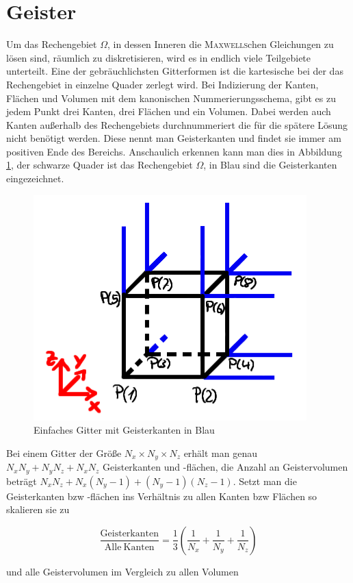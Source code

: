 
\section{Geister}

Um das Rechengebiet $\Omega$, in dessen Inneren die \textsc{Maxwells}chen Gleichungen zu lösen sind, räumlich zu diskretisieren, wird es in endlich viele Teilgebiete unterteilt. Eine der gebräuchlichsten Gitterformen ist die kartesische bei der das Rechengebiet in einzelne Quader zerlegt wird. Bei Indizierung der Kanten, Flächen und Volumen mit dem kanonischen Nummerierungsschema, gibt es zu jedem Punkt drei Kanten, drei Flächen und ein Volumen. Dabei werden auch Kanten außerhalb des Rechengebiets durchnummeriert die für die spätere Lösung nicht benötigt werden. Diese nennt man Geisterkanten und findet sie immer am positiven Ende des Bereichs. Anschaulich erkennen kann man dies in Abbildung \ref{fig:geister}, der schwarze Quader ist das Rechengebiet $\Omega$, in Blau sind die Geisterkanten eingezeichnet.

\begin{figure}[thbp]
	\centering
	\includegraphics[width=.5\textwidth]{data/Geister}
	\caption{Einfaches Gitter mit Geisterkanten in Blau}
	\label{fig:geister}
\end{figure}

Bei einem Gitter der Größe $ N_x \times N_y \times N_z$ erhält man genau $N_x N_y + N_y N_z + N_x N_z$ Geisterkanten und -flächen, die Anzahl an Geistervolumen beträgt $N_x N_z + N_x (N_y - 1) +(N_y - 1)(N_z - 1)$. Setzt man die Geisterkanten bzw -flächen ins Verhältnis zu allen Kanten bzw Flächen so skalieren sie zu 

\begin{equation*}
	\frac{\mathrm{Geisterkanten}}{\mathrm{Alle \: Kanten}} = \frac{1}{3}(\frac{1}{N_x} + \frac{1}{N_y} + \frac{1}{N_z})
\end{equation*}

und alle Geistervolumen im Vergleich zu allen Volumen 

